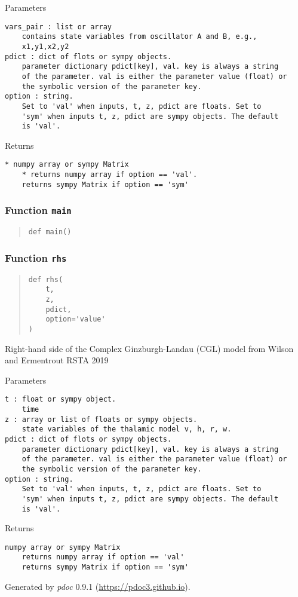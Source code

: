 \documentclass[
  english,
  a4paper,
  oneside]{article}
\begin{document}
Parameters

\begin{verbatim}
vars_pair : list or array
    contains state variables from oscillator A and B, e.g.,
    x1,y1,x2,y2
pdict : dict of flots or sympy objects.
    parameter dictionary pdict[key], val. key is always a string
    of the parameter. val is either the parameter value (float) or 
    the symbolic version of the parameter key.
option : string.
    Set to 'val' when inputs, t, z, pdict are floats. Set to
    'sym' when inputs t, z, pdict are sympy objects. The default
    is 'val'.
\end{verbatim}

Returns

\begin{verbatim}
* numpy array or sympy Matrix
    * returns numpy array if option == 'val'. 
    returns sympy Matrix if option == 'sym'
\end{verbatim}

\hypertarget{CGL.main}{%
\subsubsection{\texorpdfstring{Function
\texttt{main}}{Function main}}\label{CGL.main}}

\begin{quote}
\begin{verbatim}
def main()
\end{verbatim}
\end{quote}

\hypertarget{CGL.rhs}{%
\subsubsection{\texorpdfstring{Function
\texttt{rhs}}{Function rhs}}\label{CGL.rhs}}

\begin{quote}
\begin{verbatim}
def rhs(
    t,
    z,
    pdict,
    option='value'
)
\end{verbatim}
\end{quote}

Right-hand side of the Complex Ginzburgh-Landau (CGL) model from Wilson
and Ermentrout RSTA 2019

Parameters

\begin{verbatim}
t : float or sympy object.
    time
z : array or list of floats or sympy objects.
    state variables of the thalamic model v, h, r, w.
pdict : dict of flots or sympy objects.
    parameter dictionary pdict[key], val. key is always a string
    of the parameter. val is either the parameter value (float) or 
    the symbolic version of the parameter key.
option : string.
    Set to 'val' when inputs, t, z, pdict are floats. Set to
    'sym' when inputs t, z, pdict are sympy objects. The default
    is 'val'.
\end{verbatim}

Returns

\begin{verbatim}
numpy array or sympy Matrix
    returns numpy array if option == 'val'
    returns sympy Matrix if option == 'sym'
\end{verbatim}

Generated by \emph{pdoc} 0.9.1 (\url{https://pdoc3.github.io}).
\end{document}
